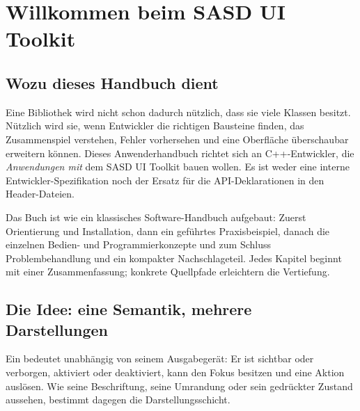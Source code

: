 \chapter{Willkommen beim SASD UI Toolkit}\label{chap:intro}

\section{Wozu dieses Handbuch dient}
Eine Bibliothek wird nicht schon dadurch nützlich, dass sie viele Klassen
besitzt. Nützlich wird sie, wenn Entwickler die richtigen Bausteine finden,
das Zusammenspiel verstehen, Fehler vorhersehen und eine Oberfläche
überschaubar erweitern können. Dieses Anwenderhandbuch richtet sich an
C++-Entwickler, die \emph{Anwendungen mit} dem SASD UI Toolkit bauen wollen.
Es ist weder eine interne Entwickler-Spezifikation noch der Ersatz für die
API-Deklarationen in den Header-Dateien.

Das Buch ist wie ein klassisches Software-Handbuch aufgebaut: Zuerst
Orientierung und Installation, dann ein geführtes Praxisbeispiel, danach
die einzelnen Bedien- und Programmierkonzepte und zum Schluss
Problembehandlung und ein kompakter Nachschlageteil. Jedes Kapitel beginnt
mit einer Zusammenfassung; konkrete Quellpfade erleichtern die Vertiefung.

\section{Die Idee: eine Semantik, mehrere Darstellungen}
Ein  bedeutet unabhängig von seinem Ausgabegerät:
Er ist sichtbar oder verborgen, aktiviert oder deaktiviert, kann den
Fokus besitzen und eine Aktion auslösen. Wie seine Beschriftung,
seine Umrandung oder sein gedrückter Zustand aussehen, bestimmt dagegen
die Darstellungsschicht.

\begin{center}
\end{center}

